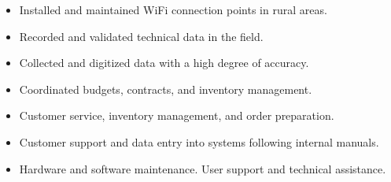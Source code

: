\documentclass[11pt, a4paper]{awesome-cv}
\begin{document}
\begin{itemize}
  \item Installed and maintained WiFi connection points in rural areas.
  \item Recorded and validated technical data in the field.
\end{itemize}

\begin{itemize}
  \item Collected and digitized data with a high degree of accuracy.
\end{itemize}

\begin{itemize}
  \item Coordinated budgets, contracts, and inventory management.
\end{itemize}

\begin{itemize}
  \item Customer service, inventory management, and order preparation.
\end{itemize}

\begin{itemize}
  \item Customer support and data entry into systems following internal manuals.
\end{itemize}

\begin{itemize}
  \item Hardware and software maintenance. User support and technical assistance.
\end{itemize}

\end{document}
